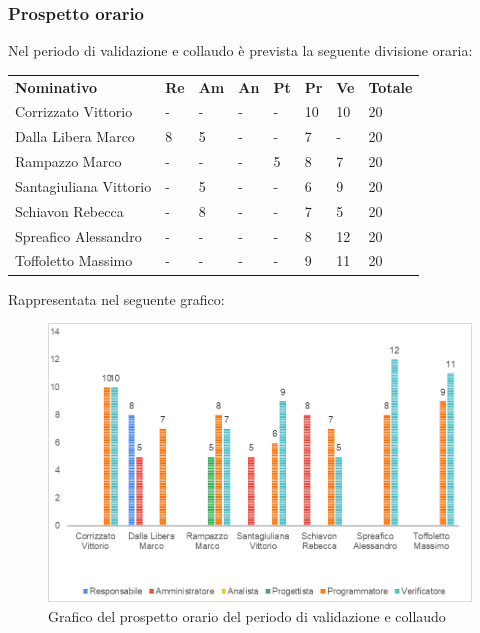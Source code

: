 \subsubsection{Prospetto orario}
Nel periodo di validazione e collaudo è prevista la seguente divisione oraria:
\begin{longtable} {				
		>{}p{40mm}  
		>{}p{8mm}
		>{}p{8mm}
		>{}p{8mm}
		>{}p{8mm}
		>{}p{8mm}
		>{}p{8mm}
		>{}p{12mm}			
	}			
	\rowcolor{gray!50}
	\textbf{Nominativo} & \textbf{Re} & \textbf{Am} & \textbf{An} & \textbf{Pt} & \textbf{Pr} & \textbf{Ve} & \textbf{Totale}	\TBstrut \\ [2mm]
	Corrizzato Vittorio & - & - & - & - & 10 & 10 & 20 \TBstrut \\ [2mm]
	Dalla Libera Marco & 8 & 5 & - & - & 7 & - & 20 \TBstrut \\ [2mm]
	Rampazzo Marco & - & - & - & 5 & 8 & 7 & 20 \TBstrut \\ [2mm]
	Santagiuliana Vittorio & - & 5 & - & - & 6 & 9 & 20 \TBstrut \\ [2mm]
	Schiavon Rebecca & - & 8 & - & - & 7 & 5 & 20 \TBstrut \\ [2mm]
	Spreafico Alessandro & - & - & - & - & 8 & 12 & 20 \TBstrut \\ [2mm]
	Toffoletto Massimo & - & - & - & - & 9 & 11 & 20 \TBstrut \\ [2mm]
\end{longtable}
Rappresentata nel seguente grafico: \\
\begin{figure} [h!]
	\includegraphics[width=\linewidth]{./img/Grafici/7.png}
	\caption{Grafico del prospetto orario del periodo di validazione e collaudo}
\end{figure}

